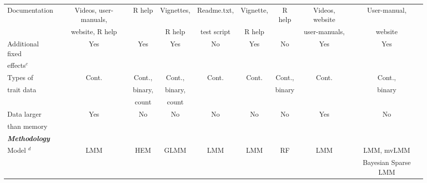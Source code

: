 \documentclass{article}
\begin{document}
\begin{landscape}
\begin{table}
\begin{tabular}{lcccccccc}
\hspace{1mm} Documentation        &  Videos,  user-manuals,              &    R help       &  Vignettes,    &   Readme.txt,       &   Vignette,          &     R help           &   Videos, website             &  User-manual,     \\  
                                                        &  website,    R help     &                      &  R help         &    test script           &  R help              &                           &    user-manuals,  &   website  \\ [0.15cm]
                                                                                         
\hspace{1mm} Additional fixed        &   Yes   &      Yes      &     Yes    &  No                 &      Yes      &      No          &      Yes & Yes     \\  
\hspace{1mm} effects$^c$               &           &                   &                 &                   &                   &                     &              &      \\  [0.15cm]

\hspace{1mm} Types of  &  Cont.      &   Cont.,          &   Cont.,           &   Cont.                 &   Cont.          &     Cont.,          &   Cont.   &  Cont.,    \\  
\hspace{1mm} trait data  &                &    binary,      &      binary,         &                   &            &     binary           &      &   binary    \\  
                                      &                &   count         &       count          &                   &            &                &      &      \\  [0.15cm]


\hspace{1mm} Data larger                   &   Yes    &      No      & No          &  No    &  No    &   No     & Yes      & No    \\  
\hspace{1mm} than memory                                             &         &            &             &                   &            &                &      &      \\  [0.8cm]


{\bf {\em Methodology} }   &         &            &             &                   &            &                &      &      \\  [0.15cm]
\hspace{1mm}  Model $^d$                    & LMM   & HEM  &  GLMM &   LMM  & LMM  & RF & LMM   & LMM, mvLMM\\ 
                      					    &             &   &              &             &          &        &           &   Bayesian Sparse LMM      \\  [0.15cm]
					    

\end{tabular}
\end{table}
\end{landscape}
\end{document}
